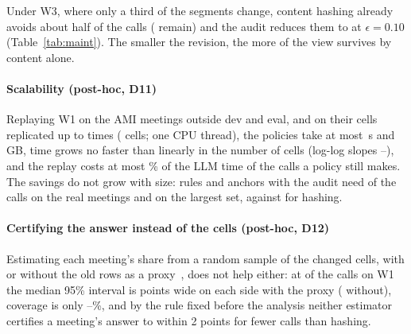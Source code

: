 \documentclass[conference]{IEEEtran}
\begin{document}
Under W3, where only a third of the segments change, content hashing already avoids about half of the calls
(\nEWthreehashshare{} remain) and the audit reduces them to \nEWthreeechobaseepsonezeroshare{} at $\epsilon=0.10$ (Table~\ref{tab:maint}).
The smaller the revision, the more of the view survives by content alone.
\paragraph*{Scalability (post-hoc, D11)} Replaying W1 on the \nScalMeet{} AMI meetings outside dev and eval, and on
their cells replicated up to \nScalRepMax{} times (\nScalCellsRep{} cells; one CPU thread), the policies take at most
\nScalPolMaxRep{}\,s and \nScalRSSRep{}\,GB, time grows no faster than linearly in the number of cells (log-log slopes
\nScalSlopeOne--\nScalSlopeMax), and the replay costs at most \nScalOverheadMax\% of the LLM time of the calls a
policy still makes. The savings do not grow with size: rules and anchors with the audit need \nScalEchoshare{} of the
calls on the real meetings and \nScalEchoshareRep{} on the largest set, against \nScalHashshare{} for hashing.
\paragraph*{Certifying the answer instead of the cells (post-hoc, D12)} Estimating each meeting's share from a
random sample of the changed cells, with or without the old rows as a proxy~\cite{blazeit,abae,ppi}, does not help
either: at \nAcShareWoneForty{} of the calls on W1 the median 95\% interval is \nAcHwWoneQoneDForty{} points wide on
each side with the proxy (\nAcHwWoneQoneSForty{} without), coverage is only \nAcCovMinDForty--\nAcCovMaxDForty\%, and
by the rule fixed before the analysis neither estimator certifies a meeting's answer to within 2 points for fewer
calls than hashing.

\end{document}
